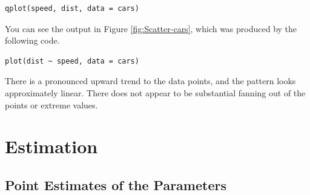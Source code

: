 \documentclass[captions=tableheading]{scrbook}
\begin{document}
\begin{example}
\begin{verbatim}
qplot(speed, dist, data = cars)
\end{verbatim}





You can see the output in Figure \ref{fig:Scatter-cars}, which was produced by the following code.


\begin{verbatim}
plot(dist ~ speed, data = cars)
\end{verbatim}

There is a pronounced upward trend to the data points, and the pattern looks approximately linear. There does not appear to be substantial fanning out of the points or extreme values. 
\end{example}
\section{Estimation}
\label{sec-11-2}

\label{sec:SLR-Estimation}
\subsection{Point Estimates of the Parameters}
\label{sec-11-2-1}

\label{sub:point-estimate-mle-slr}
\end{document}
